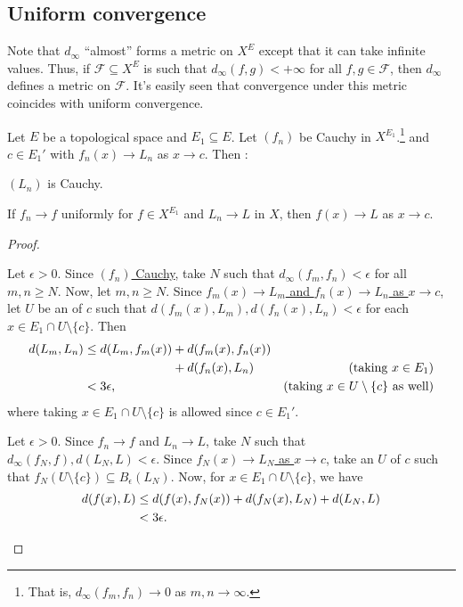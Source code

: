 	
	
	
\subsection{Uniform convergence}

	Note that $d_\infty$ ``almost'' forms a metric on $X^E$ except that it can take infinite values. Thus, if $\mathscr F\subseteq X^E$ is such that $d_\infty(f, g) < +\infty$ for all $f, g\in \mathscr F$, then $d_\infty$ defines a metric on $\mathscr F$. It's easily seen that convergence under this metric coincides with uniform convergence.
	
	
	\begin{prp}
		Let $E$ be a topological space and $E_1\subseteq E$. Let $(f_n)$ be Cauchy in $X^{E_1}$.\footnote{
			That is, $d_\infty(f_m, f_n)\to 0$ as $m, n\to\infty$.
		} and $c\in E_1'$ with $f_n(x)\to L_n$ as $x\to c$. Then \tfh:
		\begin{mylist}
			\item $(L_n)$ is Cauchy.
			
			\item If $f_n\to f$ uniformly for $f\in X^{E_1}$ and $L_n\to L$ in $X$, then $f(x)\to L$ as $x\to c$.
		\end{mylist}
	\end{prp}
	
	\begin{proof}
		\begin{mylist}
			\item Let $\epsilon > 0$. Since \uline{$(f_n)$ Cauchy}, take $N$ such that $d_\infty(f_m, f_n) < \epsilon$ for all $m, n\ge N$. Now, let $m, n\ge N$. Since \uline{$f_m(x)\to L_m$ and $f_n(x)\to L_n$ as $x\to c$}, let $U$ be an \onbd of $c$ such that $d(f_m(x), L_m), d(f_n(x), L_n) < \epsilon$ for each $x\in E_1\cap U\setminus\{c\}$. Then
			\begin{alignat*}{2}
				d(L_m, L_n)
				& \le d(L_m, f_m(x)) + d(f_m(x), f_n(x)) \\
				& \phantom{{}\le d(L_m, f_m(x))} + d(f_n(x), L_n) & \text{(taking $x\in E_1$)}\\
				& < 3\epsilon\text, & \text{(taking $x\in U\setminus \{c\}$ as well)}
			\end{alignat*}
			where taking $x\in E_1\cap U\setminus\{c\}$ is allowed since \uline{$c\in E_1'$}.
			
			
			\item Let $\epsilon > 0$. Since \uline{$f_n\to f$} and \uline{$L_n\to L$}, take $N$ such that $d_\infty(f_N, f), d(L_N, L) < \epsilon$. Since \uline{$f_N(x)\to L_N$ as $x\to c$}, take an \onbd $U$ of $c$ such that $f_N(U\setminus\{c\})\subseteq B_\epsilon(L_N)$. Now, for $x\in E_1\cap U\setminus\{c\}$, we have
			\begin{alignat*}{2}
				d(f(x), L)
				& \le d(f(x), f_N(x)) + d(f_N(x), L_N) + d(L_N, L)\\
				& < 3\epsilon\text. \tag*{\qedhere}
			\end{alignat*}
		\end{mylist}
	\end{proof}
	
